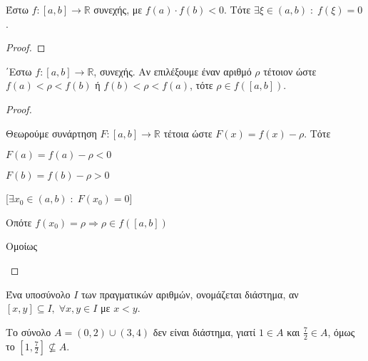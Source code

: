 \documentclass[a4paper,table]{report}
\begin{document}
\begin{thm}[Bolzano]
  Έστω $ f \colon [a,b] \to \mathbb{R} $ συνεχής, με $ f(a) \cdot f(b) <0 $. 
  Τότε $ \exists \xi \in (a,b) \; : \; f(\xi) = 0 $.
\end{thm}

\begin{proof}
\end{proof}

\begin{thm}
  ΄Εστω $ f \colon [a,b] \to \mathbb{R} $, συνεχής. Αν επιλέξουμε έναν αριθμό 
  $ \rho $ τέτοιον ώστε $ f(a) < \rho < f(b) $ ή $ f(b) < \rho < f(a) $, τότε 
  $ \rho \in f([a,b]) $.
\end{thm}

\begin{proof}
\item {}
  \begin{description}
    \item [1η Περίπτωση: $(f(a)< \rho < f(b))$]
    \item {}
      Θεωρούμε συνάρτηση $ F \colon [a,b] \to \mathbb{R} $ τέτοια ώστε $ 
      F(x) = f(x) - \rho$. Τότε 

      \begin{minipage}{0.3\textwidth}
        \begin{myitemize}
          \item $F(a) = f(a) - \rho < 0 $ \hfill {}
          \item $F(b) = f(b) - \rho >0 $ \hfill  {}
        \end{myitemize}
      \end{minipage}
      [$ \exists x_{0} \in (a,b) \; : \; F(x_{0}) = 0 $]

      Οπότε 
      $ 
      f(x_{0}) = \rho \Rightarrow \rho \in f([a,b])
      $

    \item [2η Περίπτωση: $(f(b)< \rho < f(a))$]
    \item {}
      Ομοίως
  \end{description}
\end{proof}

\begin{dfn}
  Ένα υποσύνολο $I$ των πραγματικών αριθμών, ονομάζεται διάστημα, αν 
  $ [x,y] \subseteq I, \; \forall x,y \in I $ με $ x<y $.
\end{dfn}

\begin{example}
  Το σύνολο $ A = (0,2) \cup (3,4) $ δεν είναι διάστημα, γιατί $ 1 \in A $ και 
  $ \frac{7}{2} \in A $, όμως το $ \left[1, \frac{7}{2}\right] \not\subseteq A $.
\end{example}
\end{document}

